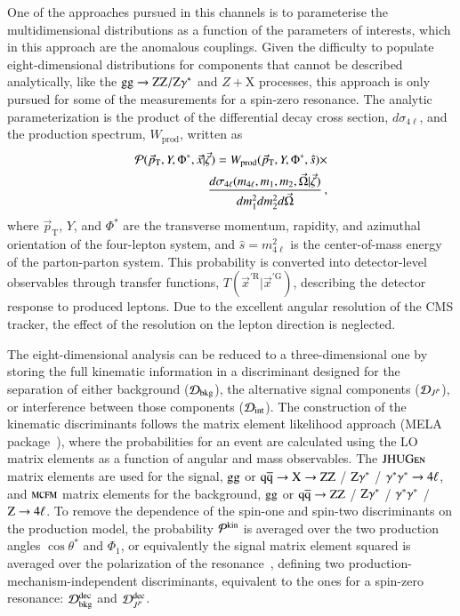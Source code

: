 One of the approaches pursued in this channels is to parameterise the
multidimensional distributions as a function of the parameters of
interests, which in this approach are the anomalous couplings. Given
the difficulty to populate eight-dimensional distributions for
components that cannot be described analytically, like the
$\mathrm{g}\mathrm{g}\to\mathrm{Z}\mathrm{Z}/\mathrm{Z}\gamma^*$ and $Z+$X processes, this approach is only
pursued for some of the measurements for a spin-zero resonance.
The analytic parameterization is the product of the differential decay cross section, 
$d\sigma_{4\ell}$, and the production spectrum, $W_{\mathrm{prod}}$, written as
%
\begin{eqnarray}
\label{eqn:gen_pdf}
{\cal P}(\vec{p}_\mathrm{T},Y,\Phi^*, \vec{x} | \vec{\zeta}) =
W_{\mathrm{prod}}(\vec{p}_\mathrm{T},Y,\Phi^*,\hat{s}) \times \\ \nonumber
\frac{d\sigma_{4\ell}(m_{4\ell},m_1, m_2, \vec\Omega | \vec{\zeta})}{dm_1^2dm_2^2d\vec\Omega}\,, 
\end{eqnarray}
%
where $\vec{p}_\mathrm{T}$, $Y$, and $\Phi^*$ are the transverse
momentum, rapidity, and azimuthal orientation of the four-lepton
system, and $\hat{s}=m_{4\ell}^2$ is the center-of-mass energy of the
parton-parton system. This probability is converted into
detector-level observables through transfer functions,
$T({\vec{x}^{\prime\mathrm{R}}} | \vec{x}^{\prime\mathrm{G}})$,
describing the detector response to produced leptons. Due to the
excellent angular resolution of the CMS tracker, the effect of the
resolution on the lepton direction is neglected.


The eight-dimensional analysis can be reduced to a three-dimensional
one by storing the full kinematic information in a discriminant
designed for the separation of either background (${\cal D}_{\rm
  bkg}$), the alternative signal components (${\cal D}_{J^P}$), or
interference between those components (${\cal D}_{\rm int}$).  The
construction of the kinematic discriminants follows the matrix element
likelihood approach ({\sc MELA}
package~\cite{Chatrchyan:2012ufa,Gao:2010qx}),
where the probabilities for an event are calculated using the LO
matrix elements as a function of angular and mass observables.  The
$\textsc{JHUGen}$ matrix elements are used for the signal, $\mathrm{g}\mathrm{g}$ or
$\mathrm{\mathrm{q}\mathrm{\overline{q}}}\to \mathrm{X}\to \mathrm{Z}\mathrm{Z}$ / $\mathrm{Z}\gamma^*$ / $\gamma^*\gamma^*\to4\ell$, and $\textsc{mcfm}$
matrix elements for the background, $\mathrm{g}\mathrm{g}$ or $\mathrm{\mathrm{q}\mathrm{\overline{q}}}\to\mathrm{Z}\mathrm{Z}$ /
$\mathrm{Z}\gamma^*$ / $\gamma^*\gamma^*$ / $\mathrm{Z}\to 4\ell$.
%
To remove the dependence of the spin-one and spin-two discriminants on
the production model, the probability ${\cal P}^{\rm kin}$ is averaged
over the two production angles $\cos\theta^*$ and $\Phi_1$, or
equivalently the signal matrix element squared is averaged over the
polarization of the resonance~\cite{Anderson:2013afp}, defining two
production-mechanism-independent discriminants, equivalent to the ones
for a spin-zero resonance: ${\cal D}^{\rm dec}_{\rm bkg}$ and ${\cal
  D}^{\rm dec}_{J^P}$.

